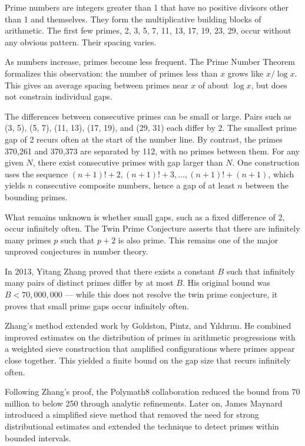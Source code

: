 Prime numbers are integers greater than 1 that have no positive divisors other than 1 and themselves. They form the multiplicative building blocks of arithmetic. The first few primes, 2, 3, 5, 7, 11, 13, 17, 19, 23, 29, occur without any obvious pattern. Their spacing varies.


As numbers increase, primes become less frequent. The Prime Number Theorem formalizes this observation: the number of primes less than $x$ grows like $x / \log x$. This gives an average spacing between primes near $x$ of about $\log x$, but does not constrain individual gaps.

The differences between consecutive primes can be small or large. Pairs such as (3, 5), (5, 7), (11, 13), (17, 19), and (29, 31) each differ by 2. The smallest prime gap of 2 recurs often at the start of the number line. By contrast, the primes 370,261 and 370,373 are separated by 112, with no primes between them. For any given $N$, there exist consecutive primes with gap larger than $N$. One construction uses the sequence $
(n+1)! + 2,  (n+1)! + 3,  \dots,  (n+1)! + (n+1)$, which yields $n$ consecutive composite numbers, hence a gap of at least $n$ between the bounding primes.

What remains unknown is whether small gaps, such as a fixed difference of 2, occur infinitely often. The Twin Prime Conjecture asserts that there are infinitely many primes $p$ such that $p + 2$ is also prime. This remains one of the major unproved conjectures in number theory.

In 2013, Yitang Zhang proved that there exists a constant $B$ such that infinitely many pairs of distinct primes differ by at most $B$. His original bound was $B < 70{,}000{,}000$ — while this does not resolve the twin prime conjecture, it proves that small prime gaps occur infinitely often.

Zhang's method extended work by Goldston, Pintz, and Yıldırım. He combined improved estimates on the distribution of primes in arithmetic progressions with a weighted sieve construction that amplified configurations where primes appear close together. This yielded a finite bound on the gap size that recurs infinitely often.

Following Zhang's proof, the Polymath8 collaboration reduced the bound from 70 million to below 250 through analytic refinements. Later on, James Maynard introduced a simplified sieve method that removed the need for strong distributional estimates and extended the technique to detect primes within bounded intervals.

